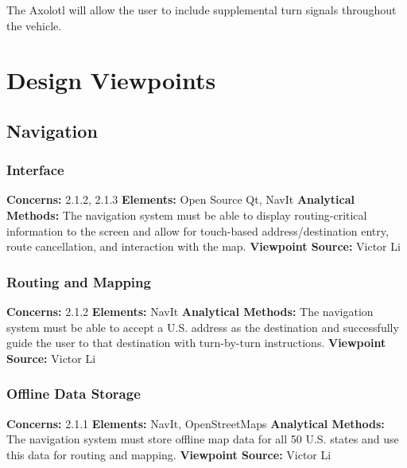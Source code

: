 \documentclass[onecolumn, draftclsnofoot,10pt, compsoc]{IEEEtran}
\begin{document}
\subsubsection{}
The Axolotl will allow the user to include supplemental turn signals throughout the vehicle.

\newpage
\section{Design Viewpoints}
\subsection{Navigation}
\subsubsection{Interface}
\textbf{Concerns:} 2.1.2, 2.1.3 \newline
\textbf{Elements:} Open Source Qt, NavIt \newline
\textbf{Analytical Methods:} The navigation system must be able to display routing-critical information to the screen and allow for touch-based address/destination entry, route cancellation, and interaction with the map. \newline
\textbf{Viewpoint Source:} Victor Li

\subsubsection{Routing and Mapping}
\textbf{Concerns:} 2.1.2 \newline
\textbf{Elements:} NavIt \newline
\textbf{Analytical Methods:} The navigation system must be able to accept a U.S. address as the destination and successfully guide the user to that destination with turn-by-turn instructions. \newline
\textbf{Viewpoint Source:} Victor Li

\subsubsection{Offline Data Storage}
\textbf{Concerns:} 2.1.1 \newline
\textbf{Elements:} NavIt, OpenStreetMaps \newline
\textbf{Analytical Methods:} The navigation system must store offline map data for all 50 U.S. states and use this data for routing and mapping. \newline
\textbf{Viewpoint Source:} Victor Li
\end{document}
